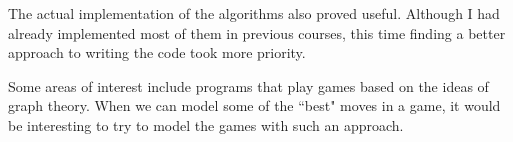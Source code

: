 \documentclass{article}
\begin{document}
	The actual implementation of the algorithms also proved useful. Although I had already 
	implemented most of them in previous courses, this time finding a better approach to writing the
	code took more priority. 

	Some areas of interest include programs that play games based on the ideas of graph theory. When 
	we can model some of the ``best" moves in a game, it would be interesting to try to model the 
	games with such an approach. 
\end{document}
